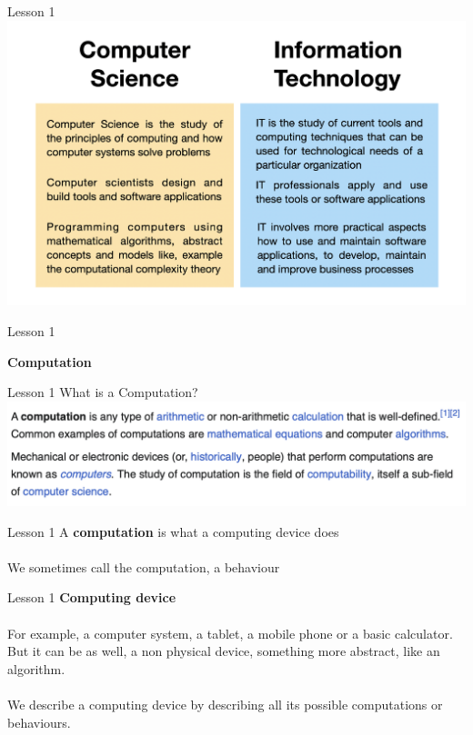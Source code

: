 \documentclass[aspectratio=1610]{beamer}
\begin{document}
\begin{frame}{Lesson 1}{}
\includegraphics[scale=0.15]{Images/csvsit.png}
\end{frame}

\begin{frame}{Lesson 1}{}
\begin{center}
\Huge \textbf{Computation}
\end{center}
\end{frame}

\begin{frame}{Lesson 1}{}
{\Huge{What is a Computation?}}
\includegraphics[scale=0.58]{Images/computation.png}
\end{frame}



\begin{frame}{Lesson 1}{}
\Huge
A \textbf{computation} is what a \alert{computing device} does\\~\\

\Large
We sometimes call the computation, a behaviour

\end{frame}



\begin{frame}{Lesson 1}{}
\LARGE
\textbf{Computing device}\\~\\
\Large
For example, a computer system, a tablet, a mobile phone or a basic calculator. But it can be as well, a non physical device, something more abstract, like an \alert{algorithm}.\\~\\

We describe a computing device by describing all its possible computations or behaviours. 

\end{frame}
\end{document}
